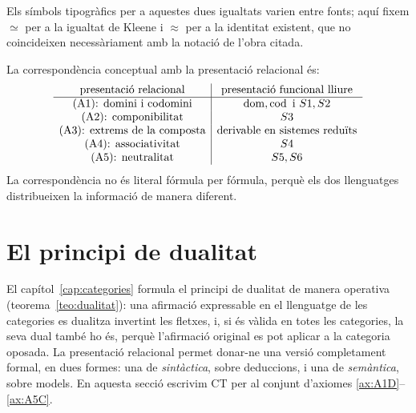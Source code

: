\begin{nota}
Els símbols tipogràfics per a aquestes dues igualtats varien entre fonts; aquí fixem $\simeq$ per a la igualtat de Kleene i $\approx$ per a la identitat existent, que no coincideixen necessàriament amb la notació de l'obra citada.
\end{nota}

La correspondència conceptual amb la presentació relacional és:
\[
\begin{array}{c|c}
\text{presentació relacional} & \text{presentació funcional lliure}\\
\hline
\text{(A1): domini i codomini} & \operatorname{dom},\operatorname{cod}\ \text{i } S1,S2\\
\text{(A2): componibilitat} & S3\\
\text{(A3): extrems de la composta} & \text{derivable en sistemes reduïts}\\
\text{(A4): associativitat} & S4\\
\text{(A5): neutralitat} & S5,S6
\end{array}
\]
La correspondència no és literal fórmula per fórmula, perquè els dos llenguatges distribueixen la informació de manera diferent.

\section{El principi de dualitat}
\label{sec:ar-dualitat}

El capítol~\ref{cap:categories} formula el principi de dualitat de manera operativa (teorema~\ref{teo:dualitat}): una afirmació expressable en el llenguatge de les categories es dualitza invertint les fletxes, i, si és vàlida en totes les categories, la seva dual també ho és, perquè l'afirmació original es pot aplicar a la categoria oposada. La presentació relacional permet donar-ne una versió completament formal, en dues formes: una de \emph{sintàctica}, sobre deduccions, i una de \emph{semàntica}, sobre models. En aquesta secció escrivim $\mathrm{CT}$ per al conjunt d'axiomes \eqref{ax:A1D}--\eqref{ax:A5C}.

